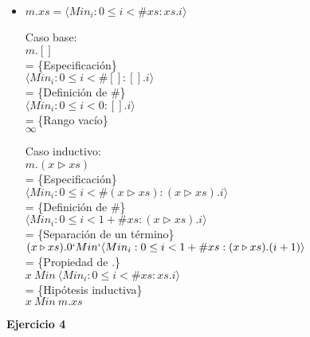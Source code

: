 \documentclass[12pt]{article}
\begin{document}
\begin{itemize}
    \item $ m.xs = \langle Min_i : 0 \le i < \#xs : xs.i \rangle $

    \bigbreak

    Caso base:\\
    $ m.[] $\\
    = \{Especificación\}\\
    $ \langle Min_i : 0 \le i < \#[] : [].i \rangle $\\
    = \{Definición de \#\}\\
    $ \langle Min_i : 0 \le i < 0 : [].i \rangle $\\
    = \{Rango vacío\}\\
    $ \infty $

    \bigbreak

    Caso inductivo:\\
    $ m.(x \triangleright xs) $\\
    = \{Especificación\}\\
    $ \langle Min_i : 0 \le i < \#(x \triangleright xs) : (x \triangleright xs).i \rangle $\\ 
    = \{Definición de \#\}\\
    $ \langle Min_i : 0 \le i < 1 + \#xs : (x \triangleright xs).i \rangle $\\ 
    = \{Separación de un término\}\\
    $ (x \triangleright xs).0 `Min` \langle Min_i : 0 \le i < 1 + \#xs : (x \triangleright xs).(i + 1) \rangle $\\ 
    = \{Propiedad de .\}\\
    $ x \ Min\ \langle Min_i : 0 \le i < \#xs : xs.i \rangle $\\ 
    = \{Hipótesis inductiva\}\\
    $ x \ Min\ m.xs $

\end{itemize}

\textbf{Ejercicio 4}
\end{document}
